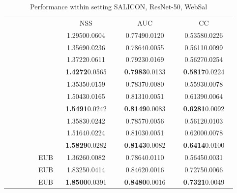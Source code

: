 \documentclass[runningheads]{llncs}
\begin{document}
\begin{table}[!t]
	\centering
	\caption{Performance within setting SALICON, ResNet-50, WebSal}
	\footnotesize
\begin{tabular}{lcccc}
		\toprule
		& & NSS & AUC & CC \\
		\cmidrule(lr){3-3} \cmidrule(lr){4-4} \cmidrule(lr){5-5}
		 &  & ~~1.29500.0604~~ & ~~0.77490.0120~~ & ~~0.53580.0226~~  \\ \midrule
		
~~~~~~~ &  & 1.35690.0236 & 0.78640.0055 & 0.56110.0099 \\
		 &  & 1.37220.0611 & 0.79230.0169 & 0.56270.0254 \\
		 &  & \textbf{1.4272}0.0565 & \textbf{0.7983}0.0133 & \textbf{0.5817}0.0224 \\ \midrule
		
 &  & 1.35350.0159 & 0.78370.0080 & 0.55930.0078  \\
		 &  & 1.50430.0165 & 0.81310.0051 & 0.61390.0064  \\
		 &  & \textbf{1.5491}0.0242 & \textbf{0.8149}0.0083 & \textbf{0.6281}0.0092 \\ \midrule
		
 &  & 1.35830.0242 & 0.78570.0056 & 0.56120.0103  \\
		 &  & 1.51640.0224 & 0.81030.0051 & 0.62000.0078  \\
		 &  & \textbf{1.5829}0.0282 & \textbf{0.8143}0.0082 & \textbf{0.6414}0.0100 \\ \midrule
		
 & EUB & 1.36260.0082 & 0.78640.0110 & 0.56450.0031 \\
		 & EUB & 1.83250.0414 & 0.84620.0016 & 0.72750.0066 \\
		 & EUB & \textbf{1.8500}0.0391 & \textbf{0.8480}0.0016 & \textbf{0.7321}0.0049 \\
		\bottomrule	
	\end{tabular}
	\label{tbl:s_r_w_sup}
\end{table}
\end{document}
